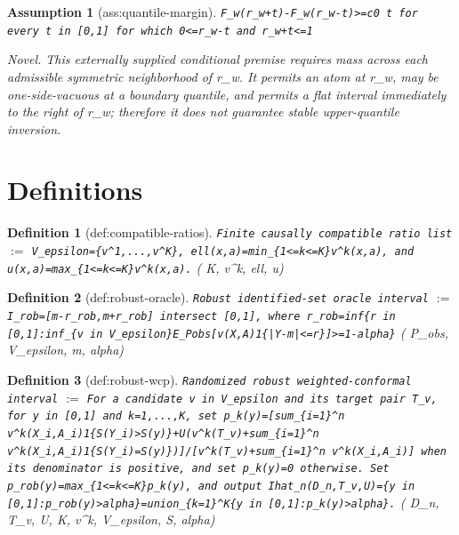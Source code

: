 \documentclass{article}
\newtheorem{assumption}{Assumption}
\newtheorem{definition}{Definition}
\begin{document}
\begin{assumption}[ass:quantile-margin]\label{ass:quantile-margin}
\texttt{F\_w(r\_w+t)-F\_w(r\_w-t)>=c0 t for every t in [0,1] for which 0<=r\_w-t and r\_w+t<=1}
\par\smallskip\noindent\emph{Novel.} This externally supplied conditional premise requires mass across each admissible symmetric neighborhood of r\_w. It permits an atom at r\_w, may be one-side-vacuous at a boundary quantile, and permits a flat interval immediately to the right of r\_w; therefore it does not guarantee stable upper-quantile inversion.
\end{assumption}

\section{Definitions}

\begin{definition}[def:compatible-ratios]\label{def:compatible-ratios}
\texttt{Finite causally compatible ratio list} $:=$ \texttt{V\_epsilon=\{v\textasciicircum{}1,...,v\textasciicircum{}K\}, ell(x,a)=min\_\{1<=k<=K\}v\textasciicircum{}k(x,a), and u(x,a)=max\_\{1<=k<=K\}v\textasciicircum{}k(x,a).} \quad ( K, v\textasciicircum{}k, ell, u)
\end{definition}

\begin{definition}[def:robust-oracle]\label{def:robust-oracle}
\texttt{Robust identified-set oracle interval} $:=$ \texttt{I\_rob=[m-r\_rob,m+r\_rob] intersect [0,1], where r\_rob=inf\{r in [0,1]:inf\_\{v in V\_epsilon\}E\_Pobs[v(X,A)1\{|Y-m|<=r\}]>=1-alpha\}} \quad ( P\_obs, V\_epsilon, m, alpha)
\end{definition}

\begin{definition}[def:robust-wcp]\label{def:robust-wcp}
\texttt{Randomized robust weighted-conformal interval} $:=$ \texttt{For a candidate v in V\_epsilon and its target pair T\_v, for y in [0,1] and k=1,...,K, set p\_k(y)=[sum\_\{i=1\}\textasciicircum{}n v\textasciicircum{}k(X\_i,A\_i)1\{S(Y\_i)>S(y)\}+U(v\textasciicircum{}k(T\_v)+sum\_\{i=1\}\textasciicircum{}n v\textasciicircum{}k(X\_i,A\_i)1\{S(Y\_i)=S(y)\})]/[v\textasciicircum{}k(T\_v)+sum\_\{i=1\}\textasciicircum{}n v\textasciicircum{}k(X\_i,A\_i)] when its denominator is positive, and set p\_k(y)=0 otherwise. Set p\_rob(y)=max\_\{1<=k<=K\}p\_k(y), and output Ihat\_n(D\_n,T\_v,U)=\{y in [0,1]:p\_rob(y)>alpha\}=union\_\{k=1\}\textasciicircum{}K\{y in [0,1]:p\_k(y)>alpha\}.} \quad ( D\_n, T\_v, U, K, v\textasciicircum{}k, V\_epsilon, S, alpha)
\end{definition}
\end{document}
